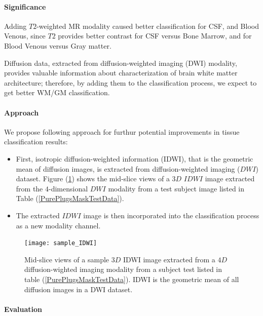\paragraph{Significance}

Adding $T2$-weighted MR modality caused better classification for CSF, and Blood Venous, since $T2$ provides better contrast for CSF versus Bone Marrow, and for Blood Venous versus Gray matter.

Diffusion data, extracted from diffusion-weighted imaging (DWI) modality, provides valuable information about characterization of brain white matter architecture; therefore, by adding them to the classification process, we expect to get better WM/GM classification.

\paragraph{Approach}

We propose following approach for furthur potential improvements in tissue classification results:
\begin{itemize}
    \item First, isotropic diffusion-weighted information (IDWI), that is the geometric mean of diffusion images, is extracted from diffusion-weighted imaging ($DWI$) dataset. Figure (\ref{fig:sample_IDWI}) shows the mid-slice views of a $3D$ $IDWI$ image extracted from the $4$-dimensional $DWI$ modality from a test subject image listed in Table (\ref{PurePlugsMaskTestData}).
    \item The extracted $IDWI$ image is then incorporated into the classification process as a new modality channel.
\end{itemize}

\begin{figure}
\centering
\texttt{[image: sample\_IDWI]}\
\centering
\caption{Mid-slice views of a sample $3D$ IDWI image extracted from a $4D$ diffusion-wighted imaging modality from a subject test listed in table (\ref{PurePlugsMaskTestData}). IDWI is the geometric mean of all diffusion images in a DWI dataset.}
\label{fig:sample_IDWI}
\end{figure}

\paragraph{Evaluation}

